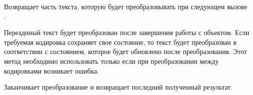\begin{methodlist}
  Возвращает часть текста, которую будет преобразовывать при следующем вызове . 
 
  Переаднный текст будет преобразован после завершения работы с объектом. 
  Если требуемая кодировка сохраняет свое состояние, то текст будет преобразован в соответствии с состоянием, которое будет обновлено после преобразования. Этот метод необходимо использовать только если при преобразовании между кодировками возникает ошибка. 
 
  Заканчивает преобразование и возвращает последний полученный результат. 
\end{methodlist}